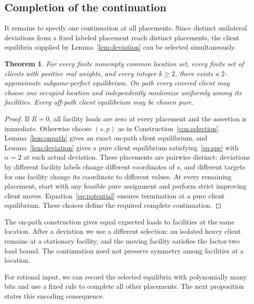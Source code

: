 \documentclass[11pt]{amsart}
\newtheorem{theorem}{Theorem}[section]
\theoremstyle{definition}
\begin{document}
\subsection{Completion of the continuation}\label{subsec:completion}
It remains to specify one continuation at all placements. Since distinct unilateral deviations from a fixed labeled placement reach distinct placements, the client equilibria supplied by Lemma~\ref{lem:deviation} can be selected simultaneously.

\begin{theorem}\label{thm:main}
For every finite nonempty common location set, every finite set of clients with positive real weights, and every integer $k\ge2$, there exists a $2$-approximate subgame-perfect equilibrium. On path every covered client may choose one occupied location and independently randomize uniformly among its facilities. Every off-path client equilibrium may be chosen pure.
\end{theorem}
\begin{proof}
If $R=0$, all facility loads are zero at every placement and the assertion is immediate. Otherwise choose $(s,p)$ as in Construction~\ref{con:selection}. Lemma~\ref{lem:onpath} gives an exact on-path client equilibrium, and Lemma~\ref{lem:deviation} gives a pure client equilibrium satisfying~\eqref{eq:spe} with $\alpha=2$ at each actual deviation. These placements are pairwise distinct: deviations by different facility labels change different coordinates of $s$, and different targets for one facility change its coordinate to different values. At every remaining placement, start with any feasible pure assignment and perform strict improving client moves. Equation~\eqref{eq:potential} ensures termination at a pure client equilibrium. These choices define the required complete continuation.
\end{proof}

The on-path construction gives equal expected loads to facilities at the same location. After a deviation we use a different selection: an isolated heavy client remains at a stationary facility, and the moving facility satisfies the factor-two load bound. The continuation need not preserve symmetry among facilities at a location.

For rational input, we can record the selected equilibria with polynomially many bits and use a fixed rule to complete all other placements. The next proposition states this encoding consequence.
\end{document}
